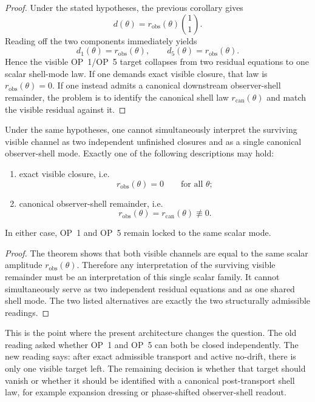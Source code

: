 \begin{proof}
Under the stated hypotheses, the previous corollary gives
\[
  d(\theta)=r_{\mathrm{obs}}(\theta)\binom{1}{1}.
\]
Reading off the two components immediately yields
\[
  d_1(\theta)=r_{\mathrm{obs}}(\theta),
  \qquad
  d_5(\theta)=r_{\mathrm{obs}}(\theta).
\]
Hence the visible OP~1/OP~5 target collapses from two residual equations to one scalar shell-mode law. If one demands exact visible closure, that law is $r_{\mathrm{obs}}(\theta)=0$. If one instead admits a canonical downstream observer-shell remainder, the problem is to identify the canonical shell law $r_{\mathrm{can}}(\theta)$ and match the visible residual against it.
\end{proof}

\begin{corollary}
Under the same hypotheses, one cannot simultaneously interpret the surviving visible channel as two independent unfinished closures and as a single canonical observer-shell mode. Exactly one of the following descriptions may hold:
\begin{enumerate}[leftmargin=2em,label=(\roman*)]
\item exact visible closure, i.e.
\[
  r_{\mathrm{obs}}(\theta)=0\qquad\text{for all }\theta;
\]
\item canonical observer-shell remainder, i.e.
\[
  r_{\mathrm{obs}}(\theta)=r_{\mathrm{can}}(\theta)\not\equiv 0.
\]
\end{enumerate}
In either case, OP~1 and OP~5 remain locked to the same scalar mode.
\end{corollary}

\begin{proof}
The theorem shows that both visible channels are equal to the same scalar amplitude $r_{\mathrm{obs}}(\theta)$. Therefore any interpretation of the surviving visible remainder must be an interpretation of this single scalar family. It cannot simultaneously serve as two independent residual equations and as one shared shell mode. The two listed alternatives are exactly the two structurally admissible readings.
\end{proof}

\begin{remark}
This is the point where the present architecture changes the question. The old reading asked whether OP~1 and OP~5 can both be closed independently. The new reading says: after exact admissible transport and active no-drift, there is only one visible target left. The remaining decision is whether that target should vanish or whether it should be identified with a canonical post-transport shell law, for example expansion dressing or phase-shifted observer-shell readout.
\end{remark}


